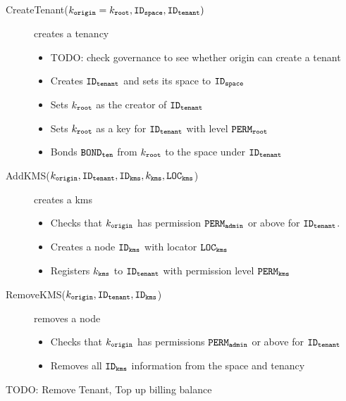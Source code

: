 \documentclass{article}
\begin{document}
\begin{description}
  \item[CreateTenant($k_\mathtt{origin} = k_\mathtt{root}, \mathtt{ID_{space}}, \mathtt{ID_{tenant}})$] creates a tenancy
    \begin{itemize}
      \item TODO: check governance to see whether origin can create a tenant
      \item Creates $\mathtt{ID_{tenant}}$ and sets its space to $\mathtt{ID_{space}}$
      \item Sets $k_\mathtt{root}$ as the creator of $\mathtt{ID_{tenant}}$
      \item Sets $k_\mathtt{root}$ as a key for $\mathtt{ID_{tenant}}$ with level $\mathtt{PERM_{root}}$
      \item Bonds $\mathtt{BOND_{ten}}$ from $k_\mathtt{root}$ to the space under $\mathtt{ID_{tenant}}$
    \end{itemize}
  \item[AddKMS($k_\mathtt{origin}, \mathtt{ID_{tenant}}, \mathtt{ID_{kms}}, k_\mathtt{kms}, \mathtt{LOC_{kms}}$)] creates a kms
    \begin{itemize}
      \item Checks that $k_\mathtt{origin}$ has permission $\mathtt{PERM_{admin}}$ or above for $\mathtt{ID_{tenant}}$.
      \item Creates a node $\mathtt{ID_{kms}}$ with locator $\mathtt{LOC_{kms}}$
      \item Registers $k_\mathtt{kms}$ to $\mathtt{ID_{tenant}}$ with permission level $\mathtt{PERM_{kms}}$
    \end{itemize}
  \item[RemoveKMS($k_\mathtt{origin}, \mathtt{ID_{tenant}}, \mathtt{ID_{kms}}$)] removes a node
    \begin{itemize}
      \item Checks that $k_\mathtt{origin}$ has permissions $\mathtt{PERM_{admin}}$ or above for $\mathtt{ID_{tenant}}$
      \item Removes all $\mathtt{ID_{kms}}$ information from the space and tenancy
    \end{itemize}
  \item[TODO: Remove Tenant, Top up billing balance]
\end{description}
\end{document}
